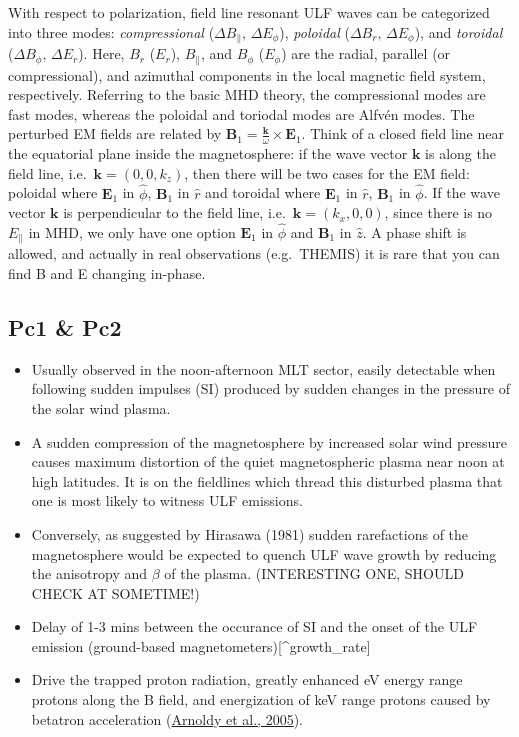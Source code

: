\documentclass[
  notoc %
]{tufte-book}
\providecommand{\tightlist}{%
  \setlength{\itemsep}{0pt}\setlength{\parskip}{0pt}
}
\begin{document}
With respect to polarization, field line resonant ULF waves can be
categorized into three modes: \emph{compressional}
(\(\Delta B_\parallel,\, \Delta E_\phi\)), \emph{poloidal}
(\(\Delta B_r,\, \Delta E_\phi\)), and \emph{toroidal}
(\(\Delta B_\phi,\, \Delta E_r\)). Here, \(B_r\) (\(E_r\)),
\(B_\parallel\), and \(B_\phi\) (\(E_\phi\)) are the radial, parallel
(or compressional), and azimuthal components in the local magnetic field
system, respectively. Referring to the basic MHD theory, the
compressional modes are fast modes, whereas the poloidal and toriodal
modes are Alfvén modes. The perturbed EM fields are related by
\(\mathbf{B}_1 = \frac{\mathbf{k}}{\omega} \times \mathbf{E}_1\). Think
of a closed field line near the equatorial plane inside the
magnetosphere: if the wave vector \(\mathbf{k}\) is along the field
line, i.e.~\(\mathbf{k} = (0,0,k_z)\), then there will be two cases for
the EM field: poloidal where \(\mathbf{E}_1\) in \(\hat{\phi}\),
\(\mathbf{B}_1\) in \(\hat{r}\) and toroidal where \(\mathbf{E}_1\) in
\(\hat{r}\), \(\mathbf{B}_1\) in \(\hat{\phi}\). If the wave vector
\(\mathbf{k}\) is perpendicular to the field line,
i.e.~\(\mathbf{k} = (k_x, 0, 0)\), since there is no \(E_\parallel\) in
MHD, we only have one option \(\mathbf{E}_1\) in \(\hat{\phi}\) and
\(\mathbf{B}_1\) in \(\hat{z}\). A phase shift is allowed, and actually
in real observations (e.g.~THEMIS) it is rare that you can find B and E
changing in-phase.

\hypertarget{pc1-pc2}{%
\subsection{Pc1 \& Pc2}\label{pc1-pc2}}

\begin{itemize}
\tightlist
\item
  Usually observed in the noon-afternoon MLT sector, easily detectable
  when following sudden impulses (SI) produced by sudden changes in the
  pressure of the solar wind plasma.
\item
  A sudden compression of the magnetosphere by increased solar wind
  pressure causes maximum distortion of the quiet magnetospheric plasma
  near noon at high latitudes. It is on the fieldlines which thread this
  disturbed plasma that one is most likely to witness ULF emissions.
\item
  Conversely, as suggested by Hirasawa (1981) sudden rarefactions of the
  magnetosphere would be expected to quench ULF wave growth by reducing
  the anisotropy and \(\beta\) of the plasma. (INTERESTING ONE, SHOULD
  CHECK AT SOMETIME!)
\item
  Delay of 1-3 mins between the occurance of SI and the onset of the ULF
  emission (ground-based magnetometers){[}\^{}growth\_rate{]}
\item
  Drive the trapped proton radiation, greatly enhanced eV energy range
  protons along the B field, and energization of keV range protons
  caused by betatron acceleration
  (\protect\hyperlink{ref-arnoldy2005pc}{Arnoldy et al., 2005}).
\end{itemize}
\end{document}
